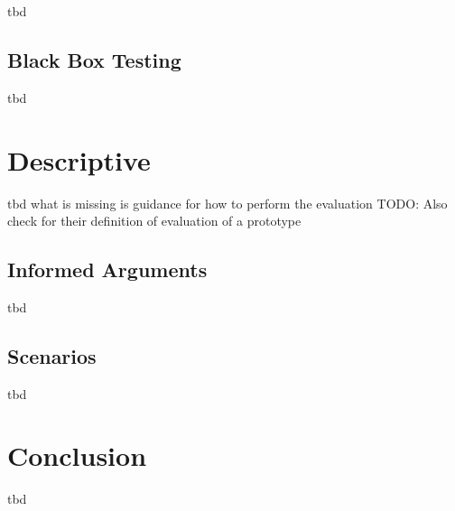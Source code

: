 tbd



\subsection{Black Box Testing}

tbd



\section{Descriptive}

tbd
what is missing is guidance for how to perform the evaluation
TODO: Also check \cite{Peffers2012} for their definition of evaluation of a prototype


\subsection{Informed Arguments}

tbd



\subsection{Scenarios}

tbd





\section{Conclusion}

tbd





